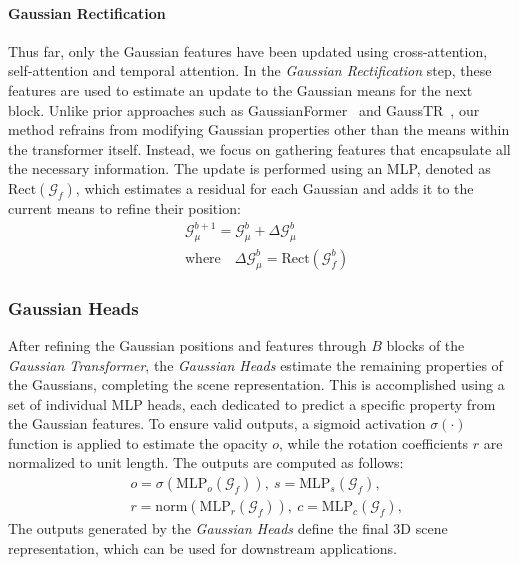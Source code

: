 \documentclass[10pt,twocolumn,letterpaper]{article}
\begin{document}
\paragraph{Gaussian Rectification}
Thus far, only the Gaussian features have been updated using cross-attention, self-attention and temporal attention.
In the \emph{Gaussian Rectification} step, these features are used to estimate an update to the Gaussian means for the next block. 
Unlike prior approaches such as GaussianFormer~\cite{huang2024gaussianformer} and GaussTR~\cite{jiang2024gausstr}, our method refrains from modifying Gaussian properties other than the means within the transformer itself.
Instead, we focus on gathering features that encapsulate all the necessary information.
The update is performed using an MLP, denoted as $\mathrm{Rect}(\mathcal{G}_f)$, which estimates a residual for each Gaussian and adds it to the current means to refine their position:
\begin{align}
    &\ \mathcal{G}^{b+1}_\mu = \mathcal{G}^{b}_\mu + \Delta \mathcal{G}^{b}_\mu \; \\
    &\ \text{where} \quad \Delta \mathcal{G}^{b}_\mu = \mathrm{Rect}(\mathcal{G}^{b}_f)
\end{align}

\subsubsection{Gaussian Heads} \label{sec:gaussian_head}
After refining the Gaussian positions and features through $B$ blocks of the \emph{Gaussian Transformer}, the \emph{Gaussian Heads} estimate the remaining properties of the Gaussians, completing the scene representation.
This is accomplished using a set of individual MLP heads, each dedicated to predict a specific property from the Gaussian features.
To ensure valid outputs, a sigmoid activation $\sigma(\cdot)$ function is applied to estimate the opacity $o$, while the rotation coefficients $r$ are normalized to unit length.
The outputs are computed as follows:
 \begin{align}
    &\ o = \sigma \left(\mathrm{MLP}_o \left(\mathcal{G}_f \right) \right), \ s = \mathrm{MLP}_s(\mathcal{G}_f), \\ 
    &\ r = \mathrm{norm}(\mathrm{MLP}_r(\mathcal{G}_f)), \ c = \mathrm{MLP}_c(\mathcal{G}_f),
\end{align}
The outputs generated by the \emph{Gaussian Heads} define the final 3D scene representation, which can be used for downstream applications.
\end{document}
